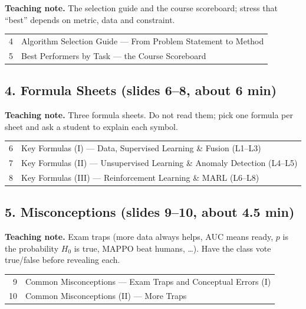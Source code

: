 \documentclass[11pt]{article}
\begin{document}
\textbf{Teaching note.} The selection guide and the course scoreboard; stress that ``best'' depends on metric, data and constraint.

\begin{center}\small\renewcommand{\arraystretch}{1.1}\begin{tabularx}{\textwidth}{@{}r X@{}}4 & Algorithm Selection Guide --- From Problem Statement to Method\\
5 & Best Performers by Task --- the Course Scoreboard\\\end{tabularx}\end{center}

\subsection{4. Formula Sheets \normalfont\small\color{GreyN}(slides 6--8, about 6 min)}

\textbf{Teaching note.} Three formula sheets. Do not read them; pick one formula per sheet and ask a student to explain each symbol.

\begin{center}\small\renewcommand{\arraystretch}{1.1}\begin{tabularx}{\textwidth}{@{}r X@{}}6 & Key Formulas (I) --- Data, Supervised Learning \& Fusion (L1--L3)\\
7 & Key Formulas (II) --- Unsupervised Learning \& Anomaly Detection (L4--L5)\\
8 & Key Formulas (III) --- Reinforcement Learning \& MARL (L6--L8)\\\end{tabularx}\end{center}

\subsection{5. Misconceptions \normalfont\small\color{GreyN}(slides 9--10, about 4.5 min)}

\textbf{Teaching note.} Exam traps (more data always helps, AUC means ready, $p$ is the probability $H_0$ is true, MAPPO beat humans, \ldots). Have the class vote true/false before revealing each.

\begin{center}\small\renewcommand{\arraystretch}{1.1}\begin{tabularx}{\textwidth}{@{}r X@{}}9 & Common Misconceptions --- Exam Traps and Conceptual Errors (I)\\
10 & Common Misconceptions (II) --- More Traps\\\end{tabularx}\end{center}
\end{document}
